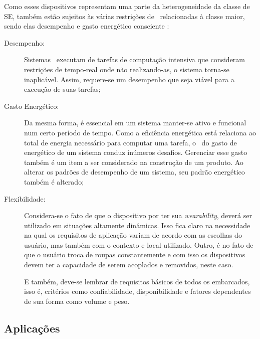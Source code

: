         
        Como esses dispositivos representam uma parte da heterogeneidade da classe de SE, também estão sujeitos às várias restrições de \design\ relacionadas à classe maior, sendo elas desempenho e gasto energético consciente \citep{Plessl2003, Jozwiak2017}:
        
        \begin{description}
            \item[Desempenho:] 
            Sistemas \wearables\ executam de tarefas de computação intensiva que consideram restrições de tempo-real onde não realizando-as, o sistema torna-se inaplicável.
            Assim, requere-se um desempenho que seja viável para a execução de suas tarefas;
            
            \item [Gasto Energético:]
            Da mesma forma, é essencial em um sistema manter-se ativo e funcional num certo período de tempo.
            Como a eficiência energética está relaciona ao total de energia necessário para computar uma tarefa, o \design\ do gasto de energético de um sistema conduz inúmeros desafios.
            Gerenciar esse gasto também é um item a ser considerado na construção de um produto.
            Ao alterar os padrões de desempenho de um sistema, seu padrão energético também é alterado;
           
            \item [Flexibilidade:] Considera-se o fato de que o dispositivo por ter sua \textit{wearability}, deverá ser utilizado em situações altamente dinâmicas.
            Isso fica claro na necessidade na qual os requisitos de aplicação variam de acordo com as escolhas do usuário, mas também com o contexto e local utilizado.
            Outro, é no fato de que o usuário troca de roupas constantemente e com isso os dispositivos devem ter a capacidade de serem acoplados e removidos, neste caso.
            
            E também, deve-se lembrar de requisitos básicos de todos os embarcados, isso é, critérios como confiabilidade, disponibilidade e fatores dependentes de sua forma como volume e peso.
        \end{description}
        
    
    
    \subsection{Aplicações}
    
